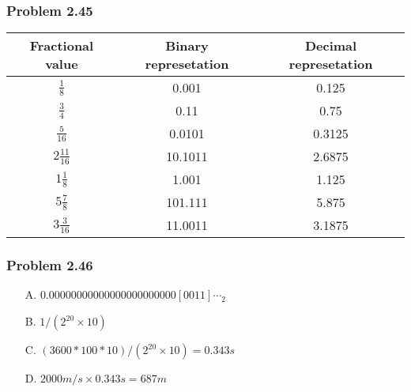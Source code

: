 \documentclass[a4paper]{article}
\begin{document}
\subsubsection*{Problem 2.45}
\begin{tabular}{c|c|c}
    Fractional value&Binary represetation&Decimal represetation\\
    \hline
    $\frac{1}{8}$&0.001&0.125\\
    \hline
    $\frac{3}{4}$&0.11&0.75\\
    \hline
    $\frac{5}{16}$&0.0101&0.3125\\
    \hline
    $2\frac{11}{16}$&10.1011&2.6875\\
    \hline
    $1\frac{1}{8}$&1.001&1.125\\
    \hline
    $5\frac{7}{8}$&101.111&5.875\\
    \hline
    $3\frac{3}{16}$&11.0011&3.1875\\
\end{tabular}

\subsubsection*{Problem 2.46}
\begin{enumerate}
    \item [A.] $0.00000000000000000000000[0011]\cdots_2$
    \item [B.] $1/(2^{20}\times10)$
    \item [C.] $(3600*100*10)/(2^{20}\times10)=0.343s$
    \item [D.] $2000m/s \times 0.343s = 687m$
\end{enumerate}

\end{document}
